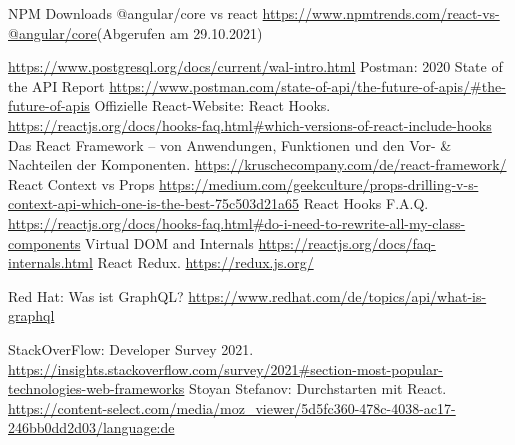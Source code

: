 \begin{thebibliography}{HR08}
 NPM Downloads @angular/core vs react \url{https://www.npmtrends.com/react-vs-@angular/core}(Abgerufen am 29.10.2021)

 \url{https://www.postgresql.org/docs/current/wal-intro.html}
Postman: 2020 State of the API Report \url{https://www.postman.com/state-of-api/the-future-of-apis/#the-future-of-apis}
 Offizielle React-Website: React Hooks. \url{https://reactjs.org/docs/hooks-faq.html#which-versions-of-react-include-hooks}
 Das React Framework – von Anwendungen, Funktionen und den Vor- \& Nachteilen der Komponenten. \url{https://kruschecompany.com/de/react-framework/}
 React Context vs Props \url{https://medium.com/geekculture/props-drilling-v-s-context-api-which-one-is-the-best-75c503d21a65}
 React Hooks F.A.Q. \url{https://reactjs.org/docs/hooks-faq.html#do-i-need-to-rewrite-all-my-class-components}
 Virtual DOM and Internals \url{https://reactjs.org/docs/faq-internals.html}
 React Redux. \url{https://redux.js.org/}


Red Hat: Was ist GraphQL? \url{https://www.redhat.com/de/topics/api/what-is-graphql}

StackOverFlow: Developer Survey 2021. \url{https://insights.stackoverflow.com/survey/2021#section-most-popular-technologies-web-frameworks}
Stoyan Stefanov: Durchstarten mit React. \url{https://content-select.com/media/moz_viewer/5d5fc360-478c-4038-ac17-246bb0dd2d03/language:de}
\end{thebibliography}
